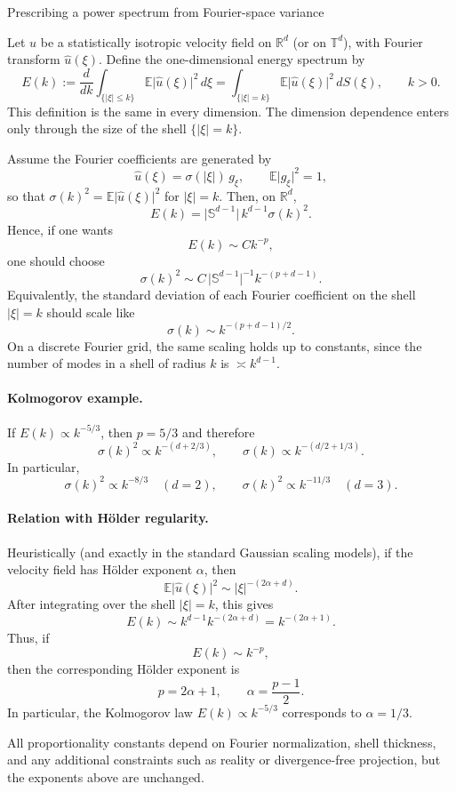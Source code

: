 \documentclass[11pt]{article}
\newcommand{\E}{\mathbb{E}}
\newcommand{\R}{\mathbb{R}}
\newcommand{\T}{\mathbb{T}}
\newcommand{\Sd}{\mathbb{S}^{d-1}}
\newcommand{\abs}[1]{\lvert #1 \rvert}
\begin{document}
\begin{center}
{\Large Prescribing a power spectrum from Fourier-space variance}
\end{center}

Let $u$ be a statistically isotropic velocity field on $\R^d$ (or on $\T^d$), with Fourier transform $\widehat u(\xi)$. Define the one-dimensional energy spectrum by
\[
E(k)
:= \frac{d}{dk}\int_{\{\abs{\xi}\le k\}} \E\abs{\widehat u(\xi)}^2\,d\xi
= \int_{\{\abs{\xi}=k\}} \E\abs{\widehat u(\xi)}^2\,dS(\xi),
\qquad k>0.
\]
This definition is the same in every dimension. The dimension dependence enters only through the size of the shell $\{\abs{\xi}=k\}$.

Assume the Fourier coefficients are generated by
\[
\widehat u(\xi)=\sigma(\abs{\xi})\,g_\xi,
\qquad \E\abs{g_\xi}^2=1,
\]
so that $\sigma(k)^2=\E\abs{\widehat u(\xi)}^2$ for $\abs{\xi}=k$. Then, on $\R^d$,
\[
E(k)=\abs{\Sd}\,k^{d-1}\sigma(k)^2.
\]
Hence, if one wants
\[
E(k)\sim Ck^{-p},
\]
one should choose
\[
\sigma(k)^2\sim C\,\abs{\Sd}^{-1}k^{-(p+d-1)}.
\]
Equivalently, the standard deviation of each Fourier coefficient on the shell $\abs{\xi}=k$ should scale like
\[
\sigma(k)\sim k^{-(p+d-1)/2}.
\]
On a discrete Fourier grid, the same scaling holds up to constants, since the number of modes in a shell of radius $k$ is $\asymp k^{d-1}$.

\paragraph{Kolmogorov example.}
If $E(k)\propto k^{-5/3}$, then $p=5/3$ and therefore
\[
\sigma(k)^2\propto k^{-(d+2/3)},
\qquad
\sigma(k)\propto k^{-(d/2+1/3)}.
\]
In particular,
\[
\sigma(k)^2\propto k^{-8/3}\quad(d=2),
\qquad
\sigma(k)^2\propto k^{-11/3}\quad(d=3).
\]

\paragraph{Relation with H\"older regularity.}
Heuristically (and exactly in the standard Gaussian scaling models), if the velocity field has H\"older exponent $\alpha$, then
\[
\E\abs{\widehat u(\xi)}^2\sim \abs{\xi}^{-(2\alpha+d)}.
\]
After integrating over the shell $\abs{\xi}=k$, this gives
\[
E(k)\sim k^{d-1}k^{-(2\alpha+d)}=k^{-(2\alpha+1)}.
\]
Thus, if
\[
E(k)\sim k^{-p},
\]
then the corresponding H\"older exponent is
\[
p=2\alpha+1,
\qquad
\alpha=\frac{p-1}{2}.
\]
In particular, the Kolmogorov law $E(k)\propto k^{-5/3}$ corresponds to $\alpha=1/3$.

\medskip
\noindent
All proportionality constants depend on Fourier normalization, shell thickness, and any additional constraints such as reality or divergence-free projection, but the exponents above are unchanged.
\end{document}
